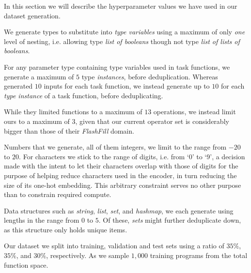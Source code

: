 \documentclass{article}
\begin{document}
In this section we will describe the hyperparameter values we have used in our dataset generation.

We generate types to substitute into \emph{type variables} using a maximum of only \emph{one} level of nesting,
i.e. allowing type \emph{list of booleans} though not type \emph{list of lists of booleans}.

For any parameter type containing type variables used in task functions,
we generate a maximum of $5$ type \emph{instances}, before deduplication.
Whereas \citet{nsps} generated $10$ inputs for each task function,
we instead generate up to $10$ for each \emph{type instance} of a task function, before deduplicating.

While they limited functions to a maximum of $13$ operations,
we instead limit ours to a maximum of $3$,
given that our current operator set is considerably bigger than those of their \emph{FlashFill} domain.

Numbers that we generate, all of them integers,
we limit to the range from $-20$ to $20$.
For characters we stick to the range of digits, i.e. from `0' to `9',
a decision made with the intent to let their characters overlap
with those of digits for the purpose of helping reduce characters used in the encoder,
in turn reducing the size of its one-hot embedding.
This arbitrary constraint serves no other purpose than to constrain required compute.

Data structures such as \emph{string}, \emph{list}, \emph{set}, and \emph{hashmap},
we each generate using lengths in the range from $0$ to $5$.
Of these, \emph{sets} might further deduplicate down,
as this structure only holds unique items.

Our dataset we split into training, validation and test sets
using a ratio of $35\%$, $35\%$, and $30\%$, respectively.
As \citep{nsps} we sample $1,000$ training programs from the total function space.

\end{document}
